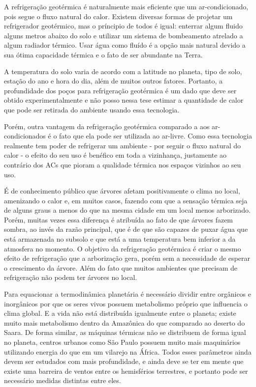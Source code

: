 A refrigeração geotérmica é naturalmente mais eficiente que um ar-condicionado, pois segue o fluxo natural do calor. Existem diversas formas de projetar um refrigerador geotérmico, mas o príncipio de todos é igual: enterrar algum fluido alguns metros abaixo do solo e utilizar um sistema de bombeamento atrelado a algum radiador térmico. Usar água como fluído é a opção mais natural devido a sua ótima capacidade térmica e o fato de ser abundante na Terra.
\par
A temperatura do solo varia de acordo com a latitude no planeta, tipo de solo, estação do ano e hora do dia, além de muitos outros fatores. Portanto, a profundidade dos poços para refrigeração geotérmica é um dado que deve ser obtido experimentalmente e não posso nessa tese estimar a quantidade de calor que pode ser retirada do ambiente usando essa tecnologia.
\par
Porém, outra vantagem da refrigeração geotérmica comparado a aos ar-condicionados é o fato que ela pode ser utilizada ao ar-livre. Como essa tecnologia realmente tem poder de refrigerar um ambiente - por seguir o fluxo natural do calor - o efeito do seu uso é benéfico em toda a vizinhança, justamente ao contrário dos ACs que pioram a qualidade térmica nos espaços vizinhos ao seu uso.

É de conhecimento público que árvores afetam positivamente o clima no local, amenizando o calor e, em muitos casos, fazendo com que a sensação térmica seja de alguns graus a menos do que na mesma cidade em um local menos arborizado. Porém, muitas vezes essa diferença é atribuída ao fato de que árvores fazem sombra, ao invés da razão principal, que é de que são capazes de puxar água que está armazenada no subsolo e que está a uma temperatura bem inferior a da atmosfera no momento. O objetivo da refrigeração geotérmica é criar o mesmo efeito de refrigeração que a arborização gera, porém sem a necessidade de esperar o crescimento da árvore. Além do fato que muitos ambientes que precisam de refrigeração não podem ter árvores no local. 

Para equacionar a termodinâmica planetária é necessário dividir entre orgânicos e inorgânicos por que os seres vivos possuem metabolismo próprio que influencia o clima global. E a vida não está distribuída igualmente entre o planeta; existe muito mais metabolismo dentro da Amazônica do que comparado ao deserto do Saara. 
De forma similar, as máquinas térmicas não se distribuem de forma igual no planeta, centros urbanos como São Paulo possuem muito mais maquinários utilizando energia do que em um vilarejo na África. Todos esses parâmetros ainda devem ser estudados com mais profundidade, e ainda deve se ter em mente que existe uma barreira de ventos entre os hemisférios terrestres, e portanto pode ser necessário medidas distintas entre eles.

